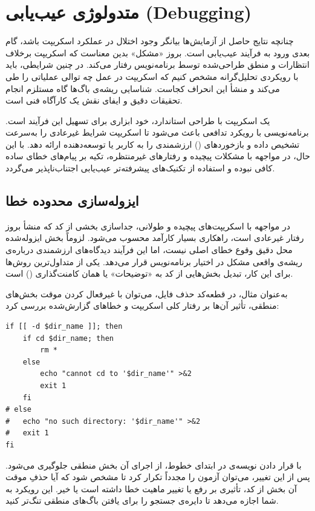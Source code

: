 \section{متدولوژی عیب‌یابی (Debugging)}

چنانچه نتایج حاصل از آزمایش‌ها بیانگر وجود اختلال در عملکرد اسکریپت باشد، گام بعدی ورود به فرآیند عیب‌یابی است. بروز «مشکل» بدین معناست که اسکریپت برخلاف انتظارات و منطق طراحی‌شده توسط برنامه‌نویس رفتار می‌کند. در چنین شرایطی، باید با رویکردی تحلیل‌گرانه مشخص کنیم که اسکریپت در عمل چه توالی عملیاتی را طی می‌کند و منشأ این انحراف کجاست. شناسایی ریشه‌ی باگ‌ها گاه مستلزم انجام تحقیقات دقیق و ایفای نقش یک کارآگاه فنی است.

یک اسکریپت با طراحی استاندارد، خود ابزاری برای تسهیل این فرآیند است. برنامه‌نویسی با رویکرد تدافعی باعث می‌شود تا اسکریپت شرایط غیرعادی را به‌سرعت تشخیص داده و بازخوردهای () ارزشمندی را به کاربر یا توسعه‌دهنده ارائه دهد. با این حال، در مواجهه با مشکلات پیچیده و رفتارهای غیرمنتظره، تکیه بر پیام‌های خطای ساده کافی نبوده و استفاده از تکنیک‌های پیشرفته‌تر عیب‌یابی اجتناب‌ناپذیر می‌گردد.

\subsection{ایزوله‌سازی محدوده خطا}

در مواجهه با اسکریپت‌های پیچیده و طولانی، جداسازی بخشی از کد که منشأ بروز رفتار غیرعادی است، راهکاری بسیار کارآمد محسوب می‌شود. لزوماً بخش ایزوله‌شده محل دقیق وقوع خطای اصلی نیست، اما این فرآیند دیدگاه‌های ارزشمندی درباره‌ی ریشه‌ی واقعی مشکل در اختیار برنامه‌نویس قرار می‌دهد. یکی از متداول‌ترین روش‌ها برای این کار، تبدیل بخش‌هایی از کد به «توضیحات» یا همان کامنت‌گذاری () است.

به‌عنوان مثال، در قطعه‌کد حذف فایل، می‌توان با غیرفعال کردن موقت بخش‌های منطقی، تأثیر آن‌ها بر رفتار کلی اسکریپت و خطاهای گزارش‌شده بررسی کرد:

\begin{latin}
\begin{lstlisting}
if [[ -d $dir_name ]]; then
    if cd $dir_name; then
        rm *
    else
        echo "cannot cd to '$dir_name'" >&2
        exit 1
    fi
# else
#   echo "no such directory: '$dir_name'" >&2
#   exit 1
fi
\end{lstlisting}
\end{latin}

با قرار دادن نویسه‌ی \cmd{\#} در ابتدای خطوط، از اجرای آن بخش منطقی جلوگیری می‌شود. پس از این تغییر، می‌توان آزمون را مجدداً تکرار کرد تا مشخص شود که آیا حذفِ موقت آن بخش از کد، تأثیری بر رفع یا تغییر ماهیت خطا داشته است یا خیر. این رویکرد به شما اجازه می‌دهد تا دایره‌ی جستجو را برای یافتن باگ‌های منطقی تنگ‌تر کنید.

